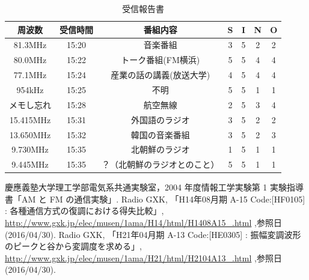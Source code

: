 \documentclass[11pt,a4j]{jsarticle}
\begin{document}
\begin{table}[H]
	\caption{受信報告書}
	\label{tab:radio}
	\begin{center}
	\begin{tabular}{|c|c|c|c|c|c|c|} %
	\hline
	周波数 & 受信時間 & 番組内容 & S & I & N & O \\
	\hline
	81.3MHz & 15:20 & 音楽番組 & 3 & 5 & 2 & 2 \\
	\hline
	80.0MHz & 15:22 & トーク番組(FM横浜) & 5 & 5 & 4 & 4 \\
	\hline
	77.1MHz & 15:24 & 産業の話の講義(放送大学) & 4 & 5 & 4 & 4 \\
	\hline
	954kHz & 15:25 & 不明 & 5 & 5 & 1 & 1 \\
	\hline
	メモし忘れ & 15:28 & 航空無線 & 2 & 5 & 3 & 4 \\
	\hline
	15.415MHz & 15:31 & 外国語のラジオ & 3 & 5 & 2 & 2 \\
	\hline
	13.650MHz & 15:32 & 韓国の音楽番組 & 3 & 5 & 2 & 3 \\
	\hline
	9.730MHz & 15:35 & 北朝鮮のラジオ & 1 & 5 & 1 & 1 \\
	\hline
	9.445MHz & 15:35 & ？（北朝鮮のラジオとのこと） & 5 & 5 & 1 & 1 \\
	\hline
	\end{tabular}
	\end{center}
\end{table}


\begin{thebibliography}{99}
 慶應義塾大学理工学部電気系共通実験室，2004 年度情報工学実験第 1 実験指導
書「AM と FM の通信実験」.
 Radio GXK, 「H14年08月期 A-15  Code:[HF0105] : 各種通信方式の復調における得失比較」, \url{http://www.gxk.jp/elec/musen/1ama/H14/html/H1408A15_.html} ,参照日(2016/04/30).
 Radio GXK, 「H21年04月期 A-13  Code:[HE0305] : 振幅変調波形のピークと谷から変調度を求める」, \url{http://www.gxk.jp/elec/musen/1ama/H21/html/H2104A13_.html} ,参照日(2016/04/30).
\end{thebibliography}
\end{document}
